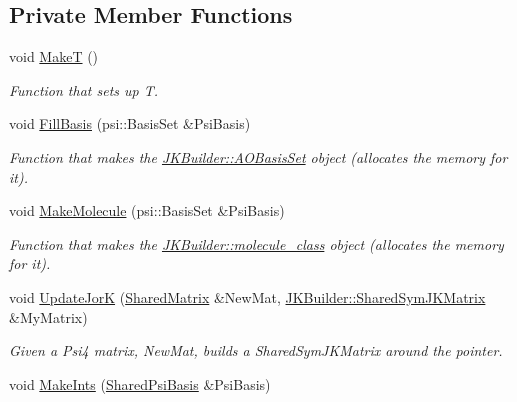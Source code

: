 \subsection*{Private Member Functions}
\begin{DoxyCompactItemize}
\item 
void \hyperlink{classpsi_1_1scf_1_1Psi4JK_a3c559c20a0aa33fa3c6d9bf9e9aefff8}{MakeT} ()
\begin{DoxyCompactList}\small\item\em Function that sets up T. \item\end{DoxyCompactList}\item 
void \hyperlink{classpsi_1_1scf_1_1Psi4JK_a33ac8f638424d92033ec6a72ffc96d6b}{FillBasis} (psi::BasisSet \&PsiBasis)
\begin{DoxyCompactList}\small\item\em Function that makes the \hyperlink{classJKBuilder_1_1AOBasisSet}{JKBuilder::AOBasisSet} object (allocates the memory for it). \item\end{DoxyCompactList}\item 
void \hyperlink{classpsi_1_1scf_1_1Psi4JK_a1cd8cf0f476576f25976b4b822230afa}{MakeMolecule} (psi::BasisSet \&PsiBasis)
\begin{DoxyCompactList}\small\item\em Function that makes the \hyperlink{classJKBuilder_1_1molecule__class}{JKBuilder::molecule\_\-class} object (allocates the memory for it). \item\end{DoxyCompactList}\item 
void \hyperlink{classpsi_1_1scf_1_1Psi4JK_ac2f36c6229344fb608c6d868377a5548}{UpdateJorK} (\hyperlink{namespacepsi_a672173d36fd5e5d06c17ff19c3bacb9d}{SharedMatrix} \&NewMat, \hyperlink{namespaceJKBuilder_aef21bc37b7cf7bc5ebb5a48628db8d0f}{JKBuilder::SharedSymJKMatrix} \&MyMatrix)
\begin{DoxyCompactList}\small\item\em Given a Psi4 matrix, NewMat, builds a SharedSymJKMatrix around the pointer. \item\end{DoxyCompactList}\item 
void \hyperlink{classpsi_1_1scf_1_1Psi4JK_a76433c0bae70a347630890a4c497b488}{MakeInts} (\hyperlink{namespacepsi_a00b3104f9d454b5adfe2d16e5f8d1e14}{SharedPsiBasis} \&PsiBasis)
\end{DoxyCompactItemize}

